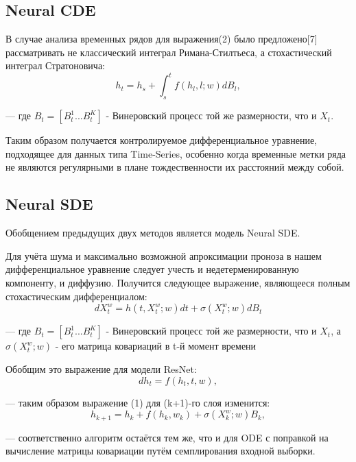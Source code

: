 \documentclass{article}
\begin{document}
   \subsection{Neural CDE}

   \par В случае анализа временных рядов для выражения(2) было предложено[7] рассматривать не классический интеграл Римана-Стилтьеса, а стохастический интеграл Стратоновича:
   \begin{equation} h_{t} = h_s + \int_s^t f(h_l, l; w) dB_l,    \end{equation}
   \par --- где $B_t=[B_t^1...B_t^K]$ - Винеровский процесс той же размерности, что и $X_t$.
   \par Таким образом получается контролируемое дифференциальное уравнение, подходящее для данных типа Time-Series, особенно когда временные метки ряда не являются регулярными в плане тождественности их расстояний между собой.
   \subsection{Neural SDE}
      \par Обобщением предыдущих двух методов является модель Neural SDE.
      \par Для учёта шума и максимально возможной апроксимации проноза в нашем дифференциальное уравнение следует учесть и недетерменированную компоненту, и диффузию. Получится следующее выражение, являющееся полным стохастическим дифференциалом:
      \begin{equation} dX_t^w = h(t, X_t^w; w) dt + \sigma(X_t^w;w) dB_t     \end{equation}
      \par --- где $B_t=[B_t^1...B_t^K]$ - Винеровский процесс той же размерности, что и $X_t$, а $\sigma(X_t^w;w)$ - его матрица ковариаций в t-й момент времени
      \par Обобщим это выражение для модели ResNet:
      \begin{equation}  dh_t = f(h_t, t, w),    \end{equation}
      \par --- таким образом выражение (1) для (k+1)-го слоя изменится:
      \begin{equation} h_{k+1} = h_k + f(h_k, w_k) +  \sigma(X_k^w;w) B_k,    \end{equation}
      \par --- соответственно алгоритм остаётся тем же, что и для ODE с поправкой на вычисление матрицы ковариации путём семплирования входной выборки.
\end{document}
